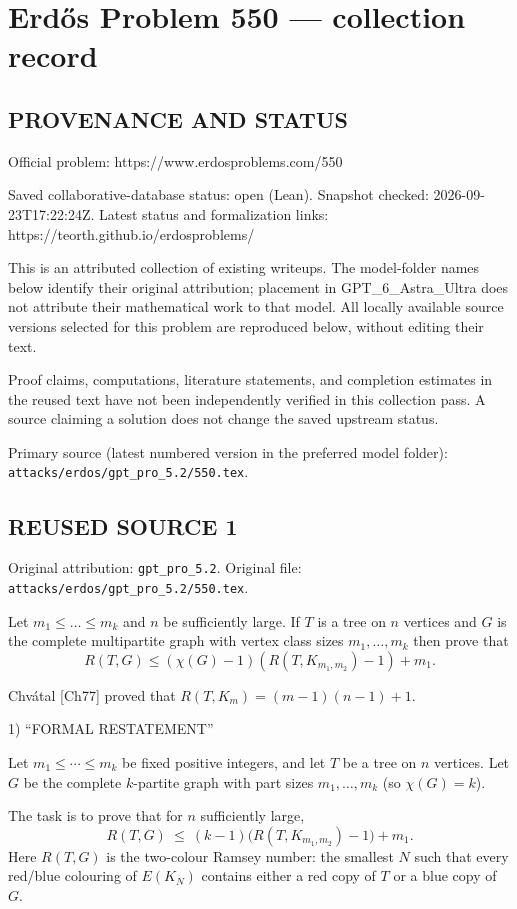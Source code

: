 \section*{Erd\H{o}s Problem 550 --- collection record}

\subsection*{PROVENANCE AND STATUS}
Official problem: https://www.erdosproblems.com/550

Saved collaborative-database status: open (Lean).
Snapshot checked: 2026-09-23T17:22:24Z.
Latest status and formalization links: https://teorth.github.io/erdosproblems/

This is an attributed collection of existing writeups. The model-folder names below identify their original attribution; placement in GPT\_6\_Astra\_Ultra does not attribute their mathematical work to that model. All locally available source versions selected for this problem are reproduced below, without editing their text.

Proof claims, computations, literature statements, and completion estimates in the reused text have not been independently verified in this collection pass. A source claiming a solution does not change the saved upstream status.

Primary source (latest numbered version in the preferred model folder): \texttt{attacks/erdos/gpt\_pro\_5.2/550.tex}.

\subsection*{REUSED SOURCE 1}
Original attribution: \texttt{gpt\_pro\_5.2}.
Original file: \texttt{attacks/erdos/gpt\_pro\_5.2/550.tex}.


Let $m_1\leq \ldots \leq m_k$ and $n$ be sufficiently large. If $T$ is a tree on $n$ vertices and $G$ is the complete multipartite graph with vertex class sizes $m_1,\ldots,m_k$ then prove that 
\[
R(T,G) \leq (\chi(G)-1)(R(T,K_{m_1,m_2})-1)+m_1.
\]

Chv\'atal [Ch77] proved that $R(T,K_m)=(m-1)(n-1)+1$.

1) “FORMAL RESTATEMENT”

Let $m_1\le \cdots \le m_k$ be fixed positive integers, and let $T$ be a tree on $n$ vertices. Let $G$ be the complete $k$-partite graph with part sizes $m_1,\dots,m_k$ (so $\chi(G)=k$).

The task is to prove that for $n$ sufficiently large,
\[
R(T,G)\ \le\ (k-1)\bigl(R(T,K_{m_1,m_2})-1\bigr)+m_1.
\]
Here $R(T,G)$ is the two-colour Ramsey number: the smallest $N$ such that every red/blue colouring of $E(K_N)$ contains either a red copy of $T$ or a blue copy of $G$.

